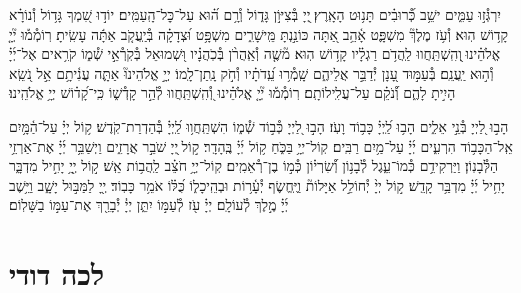 \documentclass[twoside, openany, parskip=half, 11pt]{book}
\begin{document}
יִרְגְּ֯ז֣וּ עַמִּ֑ים ישֵׁ֥ב כְּ֝֯רוּבִ֗ים תָּנ֥וּט הָאָֽרֶץ׃
֖יְיָ בְּ֯צִיּוֹ֣ן גָּד֑וֹל וְ֯רָ֥ם ה֝֗וּא עַל־כׇּל־הָֽעַמִּֽים׃
יוֹד֣וּ שִׁ֭מְךָ גָּד֥וֹל וְ֯נוֹרָ֗א קָד֥וֹשׁ הֽוּא׃
וְ֯עֹ֥ז מֶלֶךְ֘ מִשְׁפָּ֢ט אָ֫הֵ֥ב אַ֭תָּה כּוֹנַ֣נְתָּ מֵּֽישָׁרִ֑ים מִשְׁפָּ֥ט וּ֝צְדָקָ֗ה בְּ֯יַֽעֲקֹ֤ב אַתָּ֬ה עָשִֽׂיתָ׃
רֽוֹמְ֯מ֡וּ יְ֘יָ֤ אֱלֹהֵ֗ינוּ ֖וְהִֽשְׁתַּֽחֲווּ לַֽהֲדֹ֥ם רַגְלָ֗יו קָד֥וֹשׁ הֽוּא׃
מ֘שֶׁ֤ה וְ֯אַֽהֲרֹ֨ן בְּ֯כֹֽהֲנָ֗יו וּ֭שְׁמוּאֵל בְּ֯קֹֽרְ֯אֵ֣י שְׁ֯מ֑וֹ קֹרִ֥אים אֶל־יְ֜יָ֗ וְ֯ה֣וּא יַֽעֲנֵֽם׃
בְּ֯עַמּ֣וּד עָ֭נָן יְ֯דַבֵּ֣ר אֲלֵיהֶ֑ם שָֽׁמְ֯ר֥וּ עֵֽ֝דֹתָ֗יו וְ֯חֹ֣ק נָֽתַן־לָֽמוֹ׃
יְיָ֣ אֱלֹהֵינוּ֘ אַתָּ֢ה עֲנִ֫יתָ֥ם אֵ֣ל נֹ֭שֵֽׂא הָיִ֣יתָ לָהֶ֑ם וְ֝֯נֹקֵ֗ם עַל־עֲלִֽילוֹתָֽם׃
רֽוֹמְ֯מ֡וּ יְ֘יָ֤ אֱלֹהֵ֗ינוּ וְ֭֯הִֽשְׁתַּֽחֲווּ לְ֯הַ֣ר קָדְ֯שׁ֑וֹ כִּֽי־קָ֝ד֗וֹשׁ יְיָ֥ אֱלֹהֵֽינוּ׃

הָב֣וּ לַ֭יְיָ בְּ֯נֵ֣י אֵלִ֑ים הָב֥וּ לַֽ֝יְיָ֗ כָּב֥וֹד וָעֹֽז׃
הָב֣וּ לַ֭יְיָ כְּ֯ב֣וֹד שְׁ֯מ֑וֹ הִשְׁתַּֽחֲו֥וּ לַֽ֝יְיָ֗ בְּ֯הַדְרַת־קֹֽדֶשׁ׃
ק֥וֹל יְיָ֗ עַל־הַ֫מָּ֥יִם אֵֽל־הַכָּב֥וֹד הִרְעִ֑ים יְ֜יָ֗ עַל־מַ֥יִם רַבִּֽים׃
קֽוֹל־יְיָ֥ בַּכֹּ֑חַ ק֥וֹל יְ֜יָ֗ בֶּֽהָדָֽר׃
ק֣וֹל ֖יְיָ שֹׁבֵ֣ר אֲרָזִ֑ים וַיְשַׁבֵּ֥ר יְ֜יָ֗ אֶת־אַרְזֵ֥י הַלְּ֯בָנֽוֹן׃
וַיַּרְקִידֵ֥ם כְּ֯מוֹ־עֵ֑גֶל לְ֯בָנ֥וֹן וְ֝֯שִׂרְי֗וֹן כְּ֯מ֣וֹ בֶן־רְ֯אֵמִֽים׃
קֽוֹל־יְיָ֥ חֹצֵ֗ב לַֽהֲב֥וֹת אֵֽשׁ׃
ק֣וֹל יְ֖יָ֥ יָחִ֣יל מִדְבָּ֑ר יָחִ֥יל יְ֜יָ֗ מִדְבַּ֥ר קָדֵֽשׁ׃
ק֣וֹל יְיָ֨ יְ֯חוֹלֵ֣ל אַיָּלוֹת֘ וַיֶּֽחֱשׂ֢ף יְ֯עָ֫ר֥וֹת וּבְהֵֽיכָל֑וֹ כֻּ֝לּ֗וֹ אֹמֵ֥ר כָּבֽוֹד׃
יְ֖יָ לַמַּבּ֣וּל יָשָׁ֑ב וַיֵּ֥שֶׁב יְ֜יָ֗ מֶ֣לֶךְ לְ֯עוֹלָֽם׃
יְיָ֗ עֹ֖ז לְ֯עַמּ֣וֹ יִתֵּ֑ן יְיָ֓ יְ֯בָרֵ֖ךְ אֶת־עַמּ֣וֹ בַשָּׁלֽוֹם׃


\section*{ לכה דודי }

\newcommand{\lechadodi}{\textbf{לְ֯כָה דוֹדִי לִקְרַאת כַּלָּה פְּ֯נֵי שַׁבָּת נְ֯קַבְּ֯לָה׃}}
\end{document}
